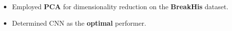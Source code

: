 \documentclass[a4paper,10.5pt]{article}
\begin{document}
\begin{itemize}
\begin{itemize}[noitemsep,nolistsep]
    \item Employed \textbf{PCA} for dimensionality reduction on the \textbf{BreakHis} dataset.    
    \vspace{0.07cm}

    \item Determined CNN as the \textbf{optimal} performer.
\end{itemize}
\vspace{0.2cm}

    




\end{itemize}
\end{document}
